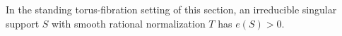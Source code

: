 
\begin{proposition}[P4.21]\hypertarget{tag-02WT}{}\label{night:P4.21}\label{stmt:P4.21}


In the standing torus-fibration setting of this section, an irreducible singular support $S$
with smooth rational normalization $T$ has $e(S)>0$.
\end{proposition}

